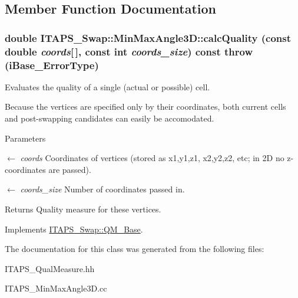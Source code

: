 \subsection{Member Function Documentation}
\hypertarget{class_i_t_a_p_s___swap_1_1_min_max_angle3_d_acad0f614af36012501c3aee66c0e85ea}{
\subsubsection[{calcQuality}]{\setlength{\rightskip}{0pt plus 5cm}double ITAPS\_\-Swap::MinMaxAngle3D::calcQuality (const double {\em coords}\mbox{[}$\,$\mbox{]}, \/  const int {\em coords\_\-size}) const  throw (iBase\_\-ErrorType)}}
\label{class_i_t_a_p_s___swap_1_1_min_max_angle3_d_acad0f614af36012501c3aee66c0e85ea}


Evaluates the quality of a single (actual or possible) cell. 

Because the vertices are specified only by their coordinates, both current cells and post-\/swapping candidates can easily be accomodated.


\begin{DoxyParams}{Parameters}
\item[\mbox{$\leftarrow$} {\em coords}]Coordinates of vertices (stored as x1,y1,z1, x2,y2,z2, etc; in 2D no z-\/coordinates are passed).\item[\mbox{$\leftarrow$} {\em coords\_\-size}]Number of coordinates passed in.\end{DoxyParams}
\begin{DoxyReturn}{Returns}
Quality measure for these vertices. 
\end{DoxyReturn}


Implements \hyperlink{class_i_t_a_p_s___swap_1_1_q_m___base_aea047b3afc06b75a1115bbaddd8286ee}{ITAPS\_\-Swap::QM\_\-Base}.



The documentation for this class was generated from the following files:\begin{DoxyCompactItemize}
\item 
ITAPS\_\-QualMeasure.hh\item 
ITAPS\_\-MinMaxAngle3D.cc\end{DoxyCompactItemize}
